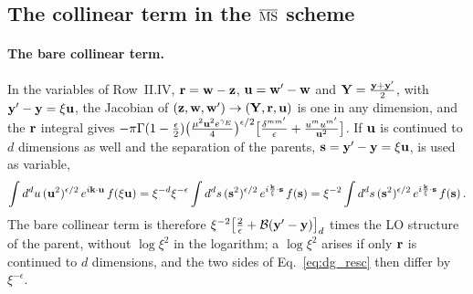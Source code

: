 \subsection{The collinear term in the \texorpdfstring{$\overline{\rm MS}$}{MS-bar} scheme}\label{sec:dg_msbar}

\paragraph{The bare collinear term.} In the variables of Row~II.IV, $\mathbf{r}=\mathbf{w}-\mathbf{z}$, $\mathbf{u}=\mathbf{w}'-\mathbf{w}$ and $\mathbf{Y}=\frac{\mathbf{y}+\mathbf{y}'}{2}$, with $\mathbf{y}'-\mathbf{y}=\xi\mathbf{u}$, the Jacobian of $(\mathbf{z},\mathbf{w},\mathbf{w}')\to(\mathbf{Y},\mathbf{r},\mathbf{u})$ is one in any dimension, and the $\mathbf{r}$ integral gives $-\pi\Gamma(1-\frac\epsilon2)\big(\frac{\mu^2\mathbf{u}^2e^{\gamma_E}}{4}\big)^{\epsilon/2}\big[\frac{\delta^{mm'}}{\epsilon}+\frac{u^mu^{m'}}{\mathbf{u}^2}\big]$. If $\mathbf{u}$ is continued to $d$ dimensions as well and the separation of the parents, $\mathbf{s}=\mathbf{y}'-\mathbf{y}=\xi\mathbf{u}$, is used as variable,
\begin{align}\label{eq:dg_resc}
\int d^du\,(\mathbf{u}^2)^{\epsilon/2}\,e^{i\mathbf{k}\cdot\mathbf{u}}\,f(\xi\mathbf{u})=\xi^{-d}\xi^{-\epsilon}\int d^ds\,(\mathbf{s}^2)^{\epsilon/2}\,e^{i\frac{\mathbf{k}}{\xi}\cdot\mathbf{s}}\,f(\mathbf{s})=\xi^{-2}\int d^ds\,(\mathbf{s}^2)^{\epsilon/2}\,e^{i\frac{\mathbf{k}}{\xi}\cdot\mathbf{s}}\,f(\mathbf{s})\,.
\end{align}
The bare collinear term is therefore $\xi^{-2}\big[\frac2\epsilon+\mathcal B(\mathbf{y}'-\mathbf{y})\big]_d$ times the LO structure of the parent, without $\log\xi^2$ in the logarithm; a $\log\xi^2$ arises if only $\mathbf{r}$ is continued to $d$ dimensions, and the two sides of Eq.~\eqref{eq:dg_resc} then differ by $\xi^{-\epsilon}$.

